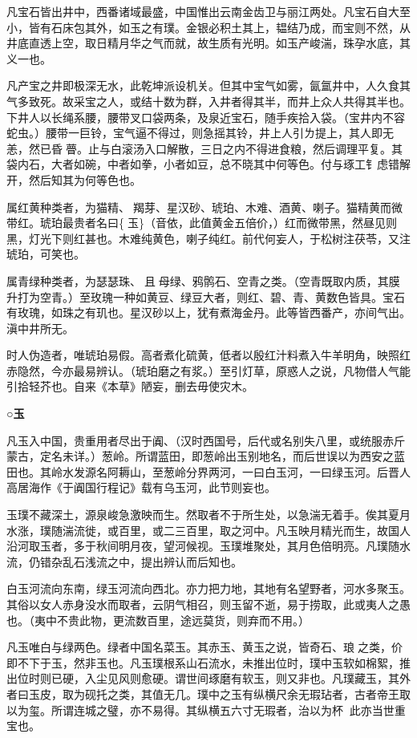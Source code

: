 \documentclass[]{article}
\begin{document}
凡宝石皆出井中，西番诸域最盛，中国惟出云南金齿卫与丽江两处。凡宝石自大至小，皆有石床包其外，如玉之有璞。金银必积土其上，韫结乃成，而宝则不然，从井底直透上空，取日精月华之气而就，故生质有光明。如玉产峻湍，珠孕水底，其义一也。

凡产宝之井即极深无水，此乾坤派设机关。但其中宝气如雾，氤氲井中，人久食其气多致死。故采宝之人，或结十数为群，入井者得其半，而井上众人共得其半也。下井人以长绳系腰，腰带叉口袋两条，及泉近宝石，随手疾拾入袋。（宝井内不容蛇虫。）腰带一巨铃，宝气逼不得过，则急摇其铃，井上人引ㄌ提上，其人即无恙，然已昏瞢。止与白滚汤入口解散，三日之内不得进食粮，然后调理平复。其袋内石，大者如碗，中者如拳，小者如豆，总不晓其中何等色。付与琢工钅虑错解开，然后知其为何等色也。

属红黄种类者，为猫精、羯芽、星汉砂、琥珀、木难、酒黄、喇子。猫精黄而微带红。琥珀最贵者名曰\{玉\}（音依，此值黄金五倍价，）红而微带黑，然昼见则黑，灯光下则红甚也。木难纯黄色，喇子纯红。前代何妄人，于松树注茯苓，又注琥珀，可笑也。

属青绿种类者，为瑟瑟珠、且母绿、鸦鹘石、空青之类。（空青既取内质，其膜升打为空青。）至玫瑰一种如黄豆、绿豆大者，则红、碧、青、黄数色皆具。宝石有玫瑰，如珠之有玑也。星汉砂以上，犹有煮海金丹。此等皆西番产，亦间气出。滇中井所无。

时人伪造者，唯琥珀易假。高者煮化硫黄，低者以殷红汁料煮入牛羊明角，映照红赤隐然，今亦最易辨认。（琥珀磨之有浆。）至引灯草，原惑人之说，凡物借人气能引拾轻芥也。自来《本草》陋妄，删去毋使灾木。

\textbf{○玉}

凡玉入中国，贵重用者尽出于阗、（汉时西国号，后代或名别失八里，或统服赤斤蒙古，定名未详。）葱岭。所谓蓝田，即葱岭出玉别地名，而后世误以为西安之蓝田也。其岭水发源名阿耨山，至葱岭分界两河，一曰白玉河，一曰绿玉河。后晋人高居海作《于阗国行程记》载有乌玉河，此节则妄也。

玉璞不藏深土，源泉峻急激映而生。然取者不于所生处，以急湍无着手。俟其夏月水涨，璞随湍流徙，或百里，或二三百里，取之河中。凡玉映月精光而生，故国人沿河取玉者，多于秋间明月夜，望河候视。玉璞堆聚处，其月色倍明亮。凡璞随水流，仍错杂乱石浅流之中，提出辨认而后知也。

白玉河流向东南，绿玉河流向西北。亦力把力地，其地有名望野者，河水多聚玉。其俗以女人赤身没水而取者，云阴气相召，则玉留不逝，易于捞取，此或夷人之愚也。（夷中不贵此物，更流数百里，途远莫货，则弃而不用。）

凡玉唯白与绿两色。绿者中国名菜玉。其赤玉、黄玉之说，皆奇石、琅之类，价即不下于玉，然非玉也。凡玉璞根系山石流水，未推出位时，璞中玉软如棉絮，推出位时则已硬，入尘见风则愈硬。谓世间琢磨有软玉，则又非也。凡璞藏玉，其外者曰玉皮，取为砚托之类，其值无几。璞中之玉有纵横尺余无瑕玷者，古者帝王取以为玺。所谓连城之璧，亦不易得。其纵横五六寸无瑕者，治以为杯，此亦当世重宝也。
\end{document}
